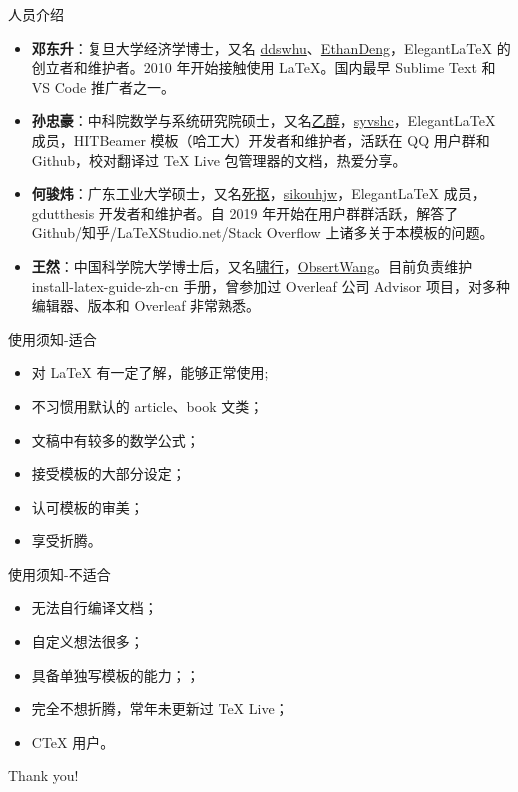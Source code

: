 \documentclass[9pt]{beamer}
\begin{document}
\begin{frame}{人员介绍}
  \begin{itemize}
    \item \textcolor{iron}{\bfseries 邓东升}：复旦大学经济学博士，又名 \underline{ddswhu}、\underline{EthanDeng}，Elegant\LaTeX{} 的创立者和维护者。2010 年开始接触使用 \LaTeX{}。国内最早 Sublime Text 和 VS Code 推广者之一。\\[2ex]
    \item \textcolor{iron}{\bfseries 孙忠豪}：中科院数学与系统研究院硕士，又名\underline{乙醇}，\underline{syvshc}，Elegant\LaTeX{} 成员，HITBeamer 模板（哈工大）开发者和维护者，活跃在 QQ 用户群和 Github，校对翻译过 \TeX{} Live 包管理器的文档，热爱分享。\\[2ex]
    \item \textcolor{iron}{\bfseries 何骏炜}：广东工业大学硕士，又名\underline{死抠}，\underline{sikouhjw}，Elegant\LaTeX{} 成员，gdutthesis 开发者和维护者。自 2019 年开始在用户群群活跃，解答了 Github/知乎/LaTeXStudio.net/Stack Overflow 上诸多关于本模板的问题。\\[2ex]
    \item \textcolor{iron}{\bfseries 王然}：中国科学院大学博士后，又名\underline{啸行}，\underline{ObsertWang}。目前负责维护 install-latex-guide-zh-cn 手册，曾参加过 Overleaf 公司 Advisor 项目，对多种编辑器、版本和 Overleaf 非常熟悉。
  \end{itemize}
\end{frame}


\begin{frame}{使用须知-适合}
  \begin{itemize}
    \item 对 \LaTeX{} 有一定了解，能够正常使用;
    \item 不习惯用默认的 article、book 文类；
    \item 文稿中有较多的数学公式；
    \item 接受模板的大部分设定；
    \item 认可模板的审美；
    \item 享受折腾。
  \end{itemize}  
\end{frame}


\begin{frame}{使用须知-不适合}
  \begin{itemize}
    \item 无法自行编译文档；
    \item 自定义想法很多；
    \item 具备单独写模板的能力；；
    \item 完全不想折腾，常年未更新过 TeX Live；
    \item CTeX 用户。
  \end{itemize}  
\end{frame}





\begin{frame}[standout]
  Thank you!
\end{frame}
\end{document}

